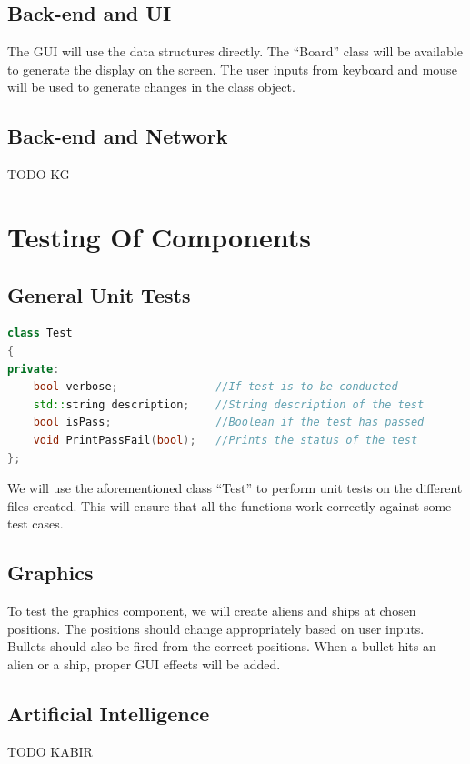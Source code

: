 \documentclass{article}
\begin{document}
			\subsection{Back-end and UI}
				The GUI will use the data structures directly. The ``Board'' class will be available to generate the display on the screen. The user inputs from keyboard and mouse will be used to generate changes in the class object. 
			\subsection{Back-end and Network}
				TODO KG
	\section{Testing Of Components}
			\subsection{General Unit Tests}
				\begin{lstlisting}[language=C++, caption={Class Parameters for Test}]
class Test
{
private:
	bool verbose;               //If test is to be conducted
	std::string description;    //String description of the test
	bool isPass;                //Boolean if the test has passed 
	void PrintPassFail(bool);   //Prints the status of the test
};
				\end{lstlisting}

				We will use the aforementioned class ``Test'' to perform unit tests on the different files created. This will ensure that all the functions work correctly against some test cases.

			\subsection{Graphics}
				To test the graphics component, we will create aliens and ships at chosen positions. The positions should change appropriately based on user inputs. Bullets should also be fired from the correct positions. When a bullet hits an alien or a ship, proper GUI effects will be added.
			\subsection{Artificial Intelligence}
				TODO KABIR
\end{document}
